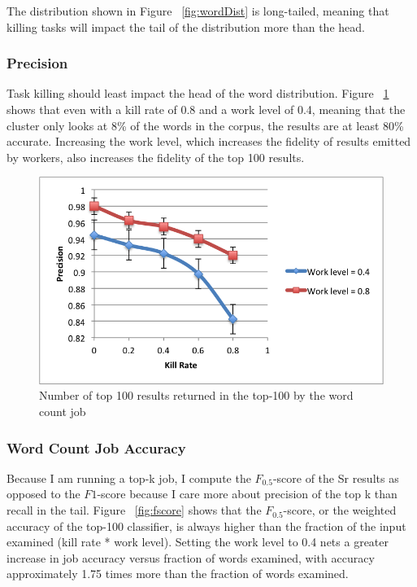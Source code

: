 \documentclass[12pt]{article}
\begin{document}
The distribution shown in Figure ~\ref{fig:wordDist} is long-tailed, meaning that killing tasks will impact the tail of the distribution more than the head.

\subsubsection{Precision}
Task killing should least impact the head of the word distribution. Figure ~\ref{fig:precision} shows that even with a kill rate of 0.8 and a work level of 0.4, meaning that the cluster only looks at 8\% of the words in the corpus, the results are at least 80\% accurate. Increasing the work level, which increases the fidelity of results emitted by workers, also increases the fidelity of the top 100 results.


\begin{figure}
\includegraphics[width=\linewidth]{top-100-precision.png}
\caption{Number of top 100 results returned in the top-100 by the word count job}
\label{fig:precision}
\end{figure}

\subsubsection{Word Count Job Accuracy}
Because I am running a top-k job, I compute the $F_{0.5}$-score of the Sr results as opposed to the $F1$-score because I care more about precision of the top k than recall in the tail. Figure ~\ref{fig:fscore} shows that the $F_{0.5}$-score, or the weighted accuracy of the top-100 classifier, is always higher than the fraction of the input examined (kill rate * work level). Setting the work level to 0.4 nets a greater increase in job accuracy versus fraction of words examined, with accuracy approximately 1.75 times more than the fraction of words examined.
\end{document}
